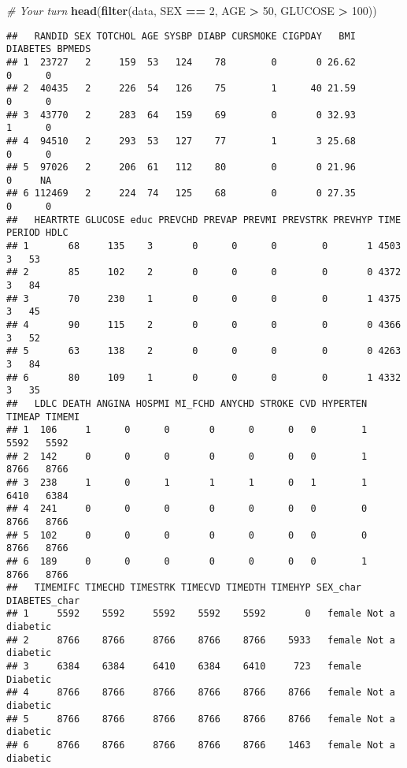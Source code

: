 \documentclass[
]{article}
\newenvironment{Shaded}{\begin{snugshade}}{\end{snugshade}}
\newcommand{\CommentTok}[1]{\textcolor[rgb]{0.56,0.35,0.01}{\textit{#1}}}
\newcommand{\DecValTok}[1]{\textcolor[rgb]{0.00,0.00,0.81}{#1}}
\newcommand{\KeywordTok}[1]{\textcolor[rgb]{0.13,0.29,0.53}{\textbf{#1}}}
\newcommand{\NormalTok}[1]{#1}
\newcommand{\OperatorTok}[1]{\textcolor[rgb]{0.81,0.36,0.00}{\textbf{#1}}}
\newcommand{\StringTok}[1]{\textcolor[rgb]{0.31,0.60,0.02}{#1}}
\begin{document}
\begin{Shaded}
\begin{Highlighting}[]
\CommentTok{# Your turn}
\KeywordTok{head}\NormalTok{(}\KeywordTok{filter}\NormalTok{(data, SEX }\OperatorTok{==}\StringTok{ }\DecValTok{2}\NormalTok{, AGE }\OperatorTok{>}\StringTok{ }\DecValTok{50}\NormalTok{, GLUCOSE }\OperatorTok{>}\StringTok{ }\DecValTok{100}\NormalTok{))}
\end{Highlighting}
\end{Shaded}

\begin{verbatim}
##   RANDID SEX TOTCHOL AGE SYSBP DIABP CURSMOKE CIGPDAY   BMI DIABETES BPMEDS
## 1  23727   2     159  53   124    78        0       0 26.62        0      0
## 2  40435   2     226  54   126    75        1      40 21.59        0      0
## 3  43770   2     283  64   159    69        0       0 32.93        1      0
## 4  94510   2     293  53   127    77        1       3 25.68        0      0
## 5  97026   2     206  61   112    80        0       0 21.96        0     NA
## 6 112469   2     224  74   125    68        0       0 27.35        0      0
##   HEARTRTE GLUCOSE educ PREVCHD PREVAP PREVMI PREVSTRK PREVHYP TIME PERIOD HDLC
## 1       68     135    3       0      0      0        0       1 4503      3   53
## 2       85     102    2       0      0      0        0       0 4372      3   84
## 3       70     230    1       0      0      0        0       1 4375      3   45
## 4       90     115    2       0      0      0        0       0 4366      3   52
## 5       63     138    2       0      0      0        0       0 4263      3   84
## 6       80     109    1       0      0      0        0       1 4332      3   35
##   LDLC DEATH ANGINA HOSPMI MI_FCHD ANYCHD STROKE CVD HYPERTEN TIMEAP TIMEMI
## 1  106     1      0      0       0      0      0   0        1   5592   5592
## 2  142     0      0      0       0      0      0   0        1   8766   8766
## 3  238     1      0      1       1      1      0   1        1   6410   6384
## 4  241     0      0      0       0      0      0   0        0   8766   8766
## 5  102     0      0      0       0      0      0   0        0   8766   8766
## 6  189     0      0      0       0      0      0   0        1   8766   8766
##   TIMEMIFC TIMECHD TIMESTRK TIMECVD TIMEDTH TIMEHYP SEX_char  DIABETES_char
## 1     5592    5592     5592    5592    5592       0   female Not a diabetic
## 2     8766    8766     8766    8766    8766    5933   female Not a diabetic
## 3     6384    6384     6410    6384    6410     723   female       Diabetic
## 4     8766    8766     8766    8766    8766    8766   female Not a diabetic
## 5     8766    8766     8766    8766    8766    8766   female Not a diabetic
## 6     8766    8766     8766    8766    8766    1463   female Not a diabetic
\end{verbatim}
\end{document}
